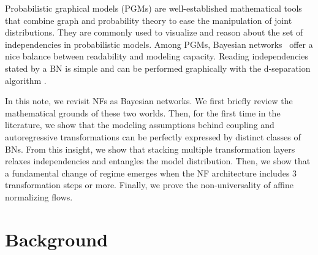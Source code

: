 \documentclass{article}
\newcommand{\gilles}[1]{\textcolor{red}{[GL: #1]}}
\begin{document}
Probabilistic graphical models (PGMs) are well-established mathematical tools that combine graph and probability theory to ease the manipulation of joint distributions. They are commonly used to visualize and reason about the set of independencies in probabilistic models. 
Among PGMs, Bayesian networks~\citep[BN, ][]{Pearl-BN} offer a nice balance between readability and modeling capacity. Reading independencies stated by a BN is simple and can be performed graphically with the d-separation algorithm \citep{d-separation}. %

In this note, we revisit NFs as Bayesian networks.
We first briefly review the mathematical grounds of these two worlds. Then, for the first time in the literature, we show that the modeling assumptions behind coupling and autoregressive transformations can be perfectly expressed by distinct classes of BNs. 
From this insight, we show that stacking multiple transformation layers relaxes independencies and entangles the model distribution.
Then, we show that a fundamental change of regime emerges when the NF architecture includes 3 transformation steps or more.
Finally, we prove the non-universality of affine normalizing flows.


\section{Background}
\end{document}
